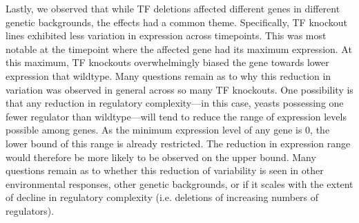 Lastly, we observed that while TF deletions affected different genes in different genetic backgrounds, the effects had a common theme. Specifically, TF knockout lines exhibited less variation in expression across timepoints. This was most notable at the timepoint where the affected gene had its maximum expression. At this maximum, TF knockouts overwhelmingly biased the gene towards lower expression that wildtype. Many questions remain as to why this reduction in variation was observed in general across so many TF knockouts. One possibility is that any reduction in regulatory complexity---in this case, yeasts possessing one fewer regulator than wildtype---will tend to reduce the range of expression levels possible among genes. As the minimum expression level of any gene is 0, the lower bound of this range is already restricted. The reduction in expression range would therefore be more likely to be observed on the upper bound. Many questions remain as to whether this reduction of variability is seen in other environmental responses, other genetic backgrounds, or if it scales with the extent of decline in regulatory complexity (i.e. deletions of increasing numbers of regulators).

